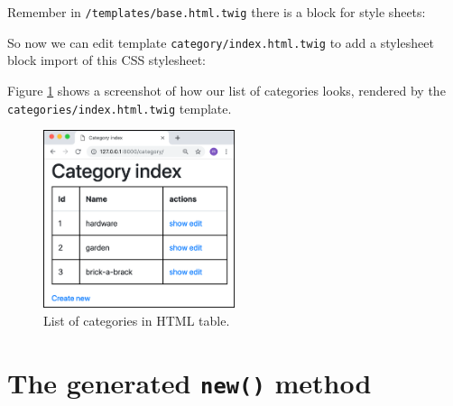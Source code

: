 \documentclass[a4paperpaper,openright]{book}
\newenvironment{Shaded}{}{}
\newcommand{\ImportTok}[1]{#1}
\newcommand{\KeywordTok}[1]{\textcolor[rgb]{0.00,0.44,0.13}{\textbf{#1}}}
\newcommand{\NormalTok}[1]{#1}
\newcommand{\OperatorTok}[1]{\textcolor[rgb]{0.40,0.40,0.40}{#1}}
\newcommand{\OtherTok}[1]{\textcolor[rgb]{0.00,0.44,0.13}{#1}}
\newcommand{\StringTok}[1]{\textcolor[rgb]{0.25,0.44,0.63}{#1}}
\begin{document}
Remember in \texttt{/templates/base.html.twig} there is a block for
style sheets:

\begin{Shaded}
\end{Shaded}

So now we can edit template \texttt{category/index.html.twig} to add a
stylesheet block import of this CSS stylesheet:

\begin{Shaded}
\end{Shaded}

Figure \ref{app_category_index} shows a screenshot of how our list of
categories looks, rendered by the \texttt{categories/index.html.twig}
template.

\begin{figure}
\centering
\includegraphics[width=0.5\textwidth,height=\textheight]{./tex2pdf.-8a1528da847c818a/7fa5d9dcad73af22289403074f4721ab58701320.png}
\caption{List of categories in HTML table. \label{app_category_index}}
\end{figure}

\hypertarget{the-generated-new-method}{%
\section{\texorpdfstring{The generated \texttt{new()}
method}{The generated new() method}}\label{the-generated-new-method}}
\end{document}
